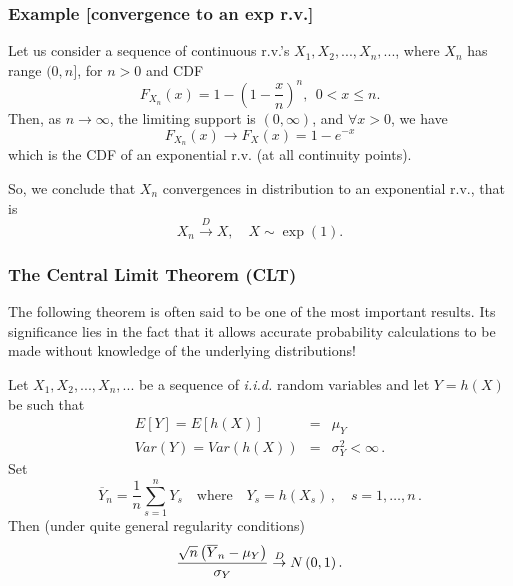 \documentclass[notes=show,smaller,handout]{beamer}
\begin{document}
\begin{frame}%
\frametitle{Example [convergence to an exp r.v.]}

\begin{example}
Let us consider a sequence of continuous r.v.'s $X_1, X_2, ..., X_n,...$, where $X_n$ has range $(0, n]$, for $n > 0$ and CDF
$$
F_{X_n} (x) = 1- \left( 1- \frac{x}{n} \right)^n,  \ \ 0<x\leq n.
$$
Then, as $n \to \infty$, the limiting support is $(0,\infty)$, and $\forall x >0$, we have
$$
F_{X_n} (x)  \to F_X(x) = 1 - e^{-x}
$$
which is the CDF of an exponential r.v. (at all continuity points). \vspace{0.5cm}

So, we conclude that $X_n$ convergences in distribution to an exponential r.v., that is
$$
X_n \overset{D}{\rightarrow } X, \quad X \sim \exp(1).
$$

\end{example}


\end{frame}%


\begin{frame}%

\frametitle{The Central Limit Theorem (CLT)}
The following theorem is often said to be one of the most important results. Its significance lies in the fact that it allows accurate probability calculations to be made without knowledge of the underlying distributions!

\begin{theorem} Let $X_{1},X_{2},...,X_{n},...$ be a sequence of \textit{i.i.d.} random variables and let $Y=h(X)$ be such that
\begin{eqnarray*}
E[Y]=E\left[ h(X)\right]  &=&\mu_Y  \\
Var(Y)=Var\left( h(X)\right)  &=&\sigma_Y ^{2}<\infty\,.
\end{eqnarray*}%
Set
$$
\overline{Y}_n=\frac{1}{n}\sum_{s=1}^nY_s\quad\text{where}\quad Y_s=h(X_s)\,,\quad s=1,\ldots,n\,.
$$
Then (under quite general regularity conditions)%
\begin{equation*}
\frac{\sqrt{n}\left( \overline{Y}_{n}-\mu_Y \right) }{\sigma_Y }\overset{D}{%
\rightarrow }N\left( 0,1\right).
\end{equation*}
\end{theorem}
\end{frame}%
\end{document}
